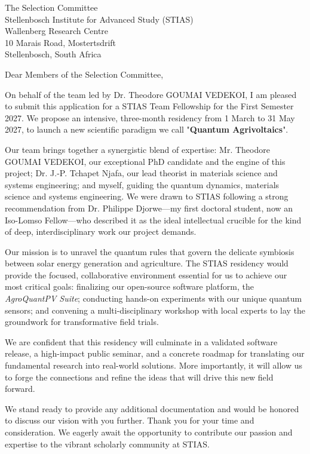 \documentclass[11pt,a4paper]{letter}
\begin{document}
\begin{letter}{The Selection Committee\\ Stellenbosch Institute for Advanced Study (STIAS)\\ Wallenberg Research Centre\\ 10 Marais Road, Mostertsdrift\\ Stellenbosch, South Africa}

\opening{Dear Members of the Selection Committee,}

On behalf of the team led by Dr. Theodore GOUMAI VEDEKOI, I am pleased to submit this application for a STIAS Team Fellowship for the First Semester 2027. We propose an intensive, three-month residency from 1 March to 31 May 2027, to launch a new scientific paradigm we call "\textbf{Quantum Agrivoltaics}".

Our team brings together a synergistic blend of expertise: Mr. Theodore GOUMAI VEDEKOI, our exceptional PhD candidate and the engine of this project; Dr. J.-P. Tchapet Njafa, our lead theorist in materials science and systems engineering; and myself, guiding the quantum dynamics, materials science and systems engineering. We were drawn to STIAS following a strong recommendation from Dr. Philippe Djorwe—my first doctoral student, now an Iso-Lomso Fellow—who described it as the ideal intellectual crucible for the kind of deep, interdisciplinary work our project demands.

Our mission is to unravel the quantum rules that govern the delicate symbiosis between solar energy generation and agriculture. The STIAS residency would provide the focused, collaborative environment essential for us to achieve our most critical goals: finalizing our open-source software platform, the \textit{AgroQuantPV Suite}; conducting hands-on experiments with our unique quantum sensors; and convening a multi-disciplinary workshop with local experts to lay the groundwork for transformative field trials.

We are confident that this residency will culminate in a validated software release, a high-impact public seminar, and a concrete roadmap for translating our fundamental research into real-world solutions. More importantly, it will allow us to forge the connections and refine the ideas that will drive this new field forward.

We stand ready to provide any additional documentation and would be honored to discuss our vision with you further. Thank you for your time and consideration. We eagerly await the opportunity to contribute our passion and expertise to the vibrant scholarly community at STIAS.


\end{letter}
\end{document}
